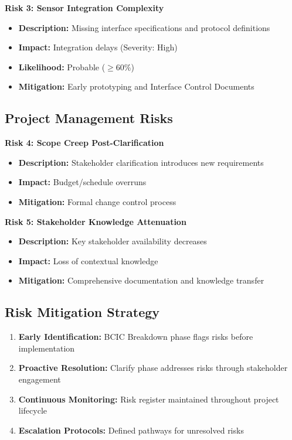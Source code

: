 \documentclass[12pt,a4paper]{article}
\begin{document}
\textbf{Risk 3: Sensor Integration Complexity}
\begin{itemize}
\item \textbf{Description:} Missing interface specifications and protocol definitions
\item \textbf{Impact:} Integration delays (Severity: High)
\item \textbf{Likelihood:} Probable ($\geq$60\%)
\item \textbf{Mitigation:} Early prototyping and Interface Control Documents
\end{itemize}

\subsection{Project Management Risks}

\textbf{Risk 4: Scope Creep Post-Clarification}
\begin{itemize}
\item \textbf{Description:} Stakeholder clarification introduces new requirements
\item \textbf{Impact:} Budget/schedule overruns
\item \textbf{Mitigation:} Formal change control process
\end{itemize}

\textbf{Risk 5: Stakeholder Knowledge Attenuation}
\begin{itemize}
\item \textbf{Description:} Key stakeholder availability decreases
\item \textbf{Impact:} Loss of contextual knowledge
\item \textbf{Mitigation:} Comprehensive documentation and knowledge transfer
\end{itemize}

\subsection{Risk Mitigation Strategy}
\begin{enumerate}
\item \textbf{Early Identification:} BCIC Breakdown phase flags risks before implementation
\item \textbf{Proactive Resolution:} Clarify phase addresses risks through stakeholder engagement
\item \textbf{Continuous Monitoring:} Risk register maintained throughout project lifecycle
\item \textbf{Escalation Protocols:} Defined pathways for unresolved risks
\end{enumerate}
\end{document}
